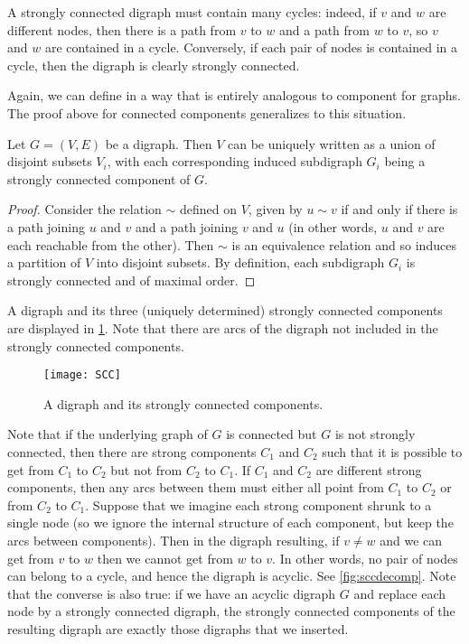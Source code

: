 A strongly connected digraph must contain many cycles: indeed, if $v$ and
$w$ are different nodes, then there is a path from $v$ to $w$ and a path
from $w$ to $v$, so $v$ and $w$ are contained in a cycle. Conversely, if
each pair of nodes is contained in a cycle, then the digraph is clearly
strongly connected.

Again, we can define  in a
way that is entirely analogous to component for graphs. The proof
above for connected components generalizes to this situation.

\begin{Theorem}
\label{thm:scc}
Let $G=(V, E)$ be a digraph. Then $V$ can be uniquely written as a union of
disjoint subsets $V_i$, with each corresponding induced subdigraph $G_i$ being
a strongly connected component of $G$.
\end{Theorem}

\begin{proof} Consider the relation $\sim$ defined on $V$, given by
$u\sim v$ if and only if there is a path joining $u$ and $v$ and a path
joining $v$ and $u$ (in other words, $u$ and $v$ are each reachable
from the other). Then $\sim$ is an equivalence relation and so induces
a partition of $V$ into disjoint subsets.  By definition, each 
subdigraph $G_i$ is strongly connected and of maximal order.
\end{proof}

\begin{Example}\label{eg:scc}
A digraph and its three (uniquely determined) strongly connected
components are displayed in \cref{fig:scc}. Note that there are
arcs of the digraph not included in the strongly connected components.
\end{Example}

\begin{figure}[htbp]
\centering
\texttt{[image: SCC]}
\caption{A digraph and its strongly connected components.}
\label{fig:scc}
\end{figure}

Note that if the underlying graph of $G$ is connected but $G$ is
not strongly connected, then  there are strong components $C_1$ and
$C_2$ such that it is possible to get from $C_1$ to $C_2$ but not
from $C_2$ to $C_1$. If $C_1$ and $C_2$ are different strong
components, then any arcs between them must either all point from
$C_1$ to $C_2$ or from $C_2$ to $C_1$.  Suppose that we imagine
each strong component shrunk to a single node (so we ignore the
internal structure of each component, but keep the arcs between
components). Then in the digraph resulting, if $v\neq w$ and we can
get from $v$ to $w$ then we cannot get from $w$ to $v$. In other
words, no pair of nodes can belong to a cycle, and hence the digraph
is acyclic. See \cref{fig:sccdecomp}. Note that the converse
is also true: if we have an acyclic digraph $G$ and replace each
node by a strongly connected digraph, the strongly connected
components of the resulting digraph are exactly those digraphs that
we inserted.

